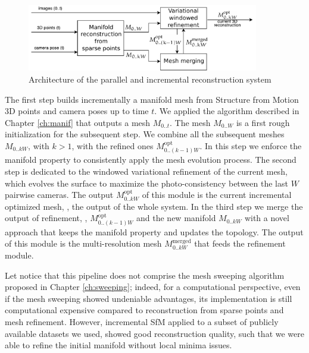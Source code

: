  \begin{figure}[t]
  \centering
  \includegraphics[width=0.9\textwidth]{./img/ch-incr-dens/incremental-mvs-architectureOK}
  \caption{Architecture of the parallel and incremental reconstruction system}
  \label{fig:architecture}
\end{figure}


The first step   builds incrementally a manifold mesh  from Structure from Motion 3D points and camera poses up to time $t$. We applied the algorithm described in Chapter \ref{ch:manif} that outputs a mesh $\mathit{M}_{0..t}$. The mesh  $\mathit{M}_{0..W}$ is a first rough initialization for the subsequent step. We combine all the subsequent meshes $\mathit{M}_{0..kW}$, with $k>1$, with the refined ones $\mathit{M}_{0..(k-1)W}^{\text{opt}}$. 
In this step we enforce the manifold property to consistently apply the mesh evolution process.
The second step is dedicated to the windowed variational refinement of the current mesh, which evolves the surface to maximize the photo-consistency between the last $W$ pairwise cameras.  
The output $\mathit{M}_{0..kW}^{\text{opt}}$ of this module is the current incremental optimized mesh, \ie, the output of the whole system.
In the third step we merge the output of refinement, \ie,   $\mathit{M}_{0..(k-1)W}^{\text{opt}}$  and the new manifold $\mathit{M}_{0..kW}$ with a novel approach that keeps the manifold property and updates the topology. 
The output of this module is the multi-resolution mesh $\mathit{M}_{0..kW}^{\text{merged}}$ that feeds the refinement module.

Let notice that this pipeline does not comprise the mesh sweeping algorithm proposed in Chapter \ref{ch:sweeping}; indeed, for a computational perspective, even if the mesh sweeping showed undeniable advantages, its implementation is still computational expensive compared to reconstruction from sparse points and mesh refinement.
However, incremental SfM applied to a subset of publicly available datasets we used, showed good reconstruction quality, such that we were able to refine the initial manifold without local minima issues.

